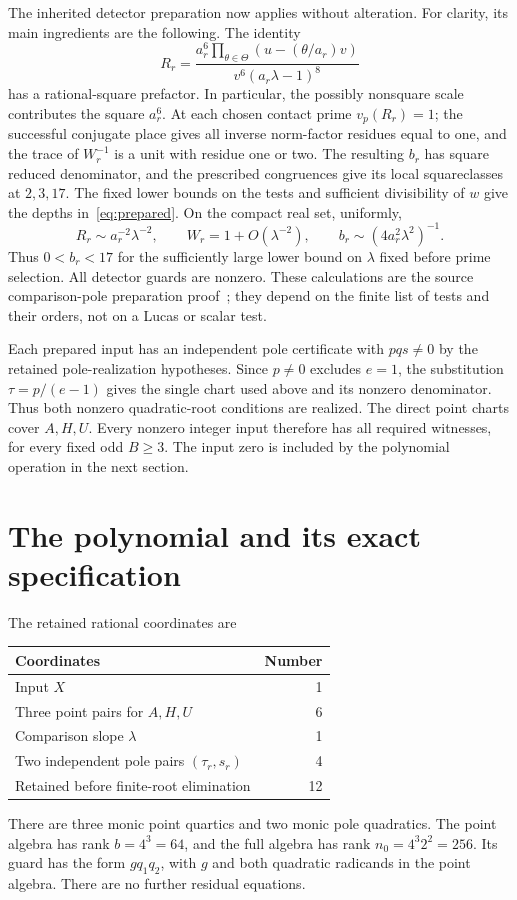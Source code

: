 \documentclass[11pt,a4paper]{article}
\begin{document}
The inherited detector preparation now applies without alteration.
For clarity, its main ingredients are the following. The identity
\[
 R_r=\frac{a_r^6\prod_{\theta\in\Theta}(u-(\theta/a_r)v)}
                  {v^6(a_r\lambda-1)^8}
\]
has a rational-square prefactor. In particular, the possibly nonsquare
scale contributes the square $a_r^6$.
At each chosen contact prime $v_p(R_r)=1$; the successful
conjugate place gives all inverse norm-factor residues equal to
one, and the trace of $W_r^{-1}$ is a unit with residue one or two.
The resulting $b_r$ has square reduced denominator, and the
prescribed congruences give its local squareclasses at $2,3,17$.
The fixed lower bounds on the tests and sufficient divisibility
of $w$ give the depths in~\eqref{eq:prepared}.
On the compact real set, uniformly,
\[
 R_r\sim a_r^{-2}\lambda^{-2},\qquad
 W_r=1+O(\lambda^{-2}),\qquad
 b_r\sim(4a_r^2\lambda^2)^{-1}.
\]
Thus $0<b_r<17$ for the sufficiently large lower bound on
$\lambda$ fixed before prime selection. All detector guards
are nonzero. These calculations are the source comparison-pole
preparation proof~\cite{Baseline}; they depend on the finite
list of tests and their orders, not on a Lucas or scalar test.

Each prepared input has an independent pole certificate with
$pqs\ne0$ by the retained pole-realization hypotheses.
Since $p\ne0$ excludes $e=1$, the substitution
$\tau=p/(e-1)$ gives the single chart used above and its
nonzero denominator. Thus both nonzero quadratic-root conditions
are realized. The direct point charts cover $A,H,U$.
Every nonzero integer input therefore has all required witnesses,
for every fixed odd $B\ge3$. The input zero is included by the
polynomial operation in the next section.

\section{The polynomial and its exact specification}

The retained rational coordinates are
\begin{center}
\begin{tabular}{lr}
\toprule
Coordinates & Number\\\midrule
Input $X$ & 1\\
Three point pairs for $A,H,U$ & 6\\
Comparison slope $\lambda$ & 1\\
Two independent pole pairs $(\tau_r,s_r)$ & 4\\\midrule
Retained before finite-root elimination & 12\\\bottomrule
\end{tabular}
\end{center}
There are three monic point quartics and two monic pole quadratics.
The point algebra has rank $b=4^3=64$, and the full algebra has
rank $n_0=4^3 2^2=256$. Its guard has the form $gq_1q_2$, with
$g$ and both quadratic radicands in the point algebra. There
are no further residual equations.
\end{document}
